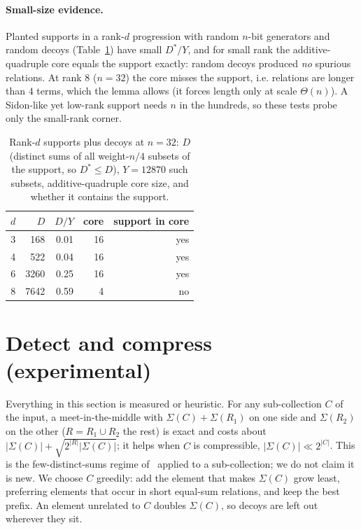 \documentclass[conference]{IEEEtran}
\begin{document}
\paragraph*{Small-size evidence.}
Planted supports in a rank-$d$ progression with random $n$-bit generators and
random decoys (Table~\ref{tab:energy}) have small $D^*/Y$, and for
small rank the additive-quadruple core equals the support exactly: random decoys
produced \emph{no} spurious relations. At rank $8$ ($n=32$) the core misses the
support, i.e. relations are longer than $4$ terms, which the lemma allows (it forces length only at scale $\Theta(n)$). A
Sidon-like yet low-rank support needs $n$ in the hundreds, so these tests
probe only the small-rank corner.

\begin{table}[t]
\centering
\caption{Rank-$d$ supports plus decoys at $n=32$: $D$ (distinct sums of all weight-$n/4$ subsets of the
support, so $D^*\le D$), $Y=12870$ such subsets, additive-quadruple
core size, and whether it contains the support.}
\label{tab:energy}
\begin{tabular}{rrrrr}
\toprule
$d$ & $D$ & $D/Y$ & core & support in core\\
\midrule
3 & 168 & 0.01 & 16 & yes\\
4 & 522 & 0.04 & 16 & yes\\
6 & 3260 & 0.25 & 16 & yes\\
8 & 7642 & 0.59 & 4 & no\\
\bottomrule
\end{tabular}
\end{table}

\section{Detect and compress (experimental)}\label{sec:compress}
Everything in this section is measured or heuristic. For any sub-collection $C$ of the
input, a meet-in-the-middle with $\Sigma(C)+\Sigma(R_1)$ on one side and $\Sigma(R_2)$ on the
other ($R=R_1\cup R_2$ the rest) is exact and costs about
$|\Sigma(C)|+\sqrt{2^{|R|}|\Sigma(C)|}$; it helps when $C$ is compressible,
$|\Sigma(C)|\ll2^{|C|}$. This is the few-distinct-sums regime of~\cite{akkn,rwdoubling}
applied to a sub-collection; we do not claim it is new. We choose $C$ greedily: add the element
that makes $\Sigma(C)$ grow least, preferring elements that occur in short equal-sum relations,
and keep the best prefix. An element unrelated to $C$ doubles $\Sigma(C)$, so decoys are left
out wherever they sit.
\end{document}
